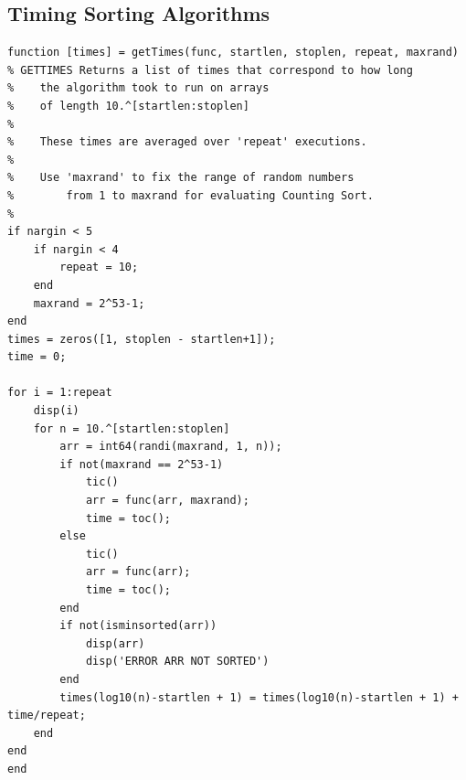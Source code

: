 \documentclass[a4paper]{article}
\begin{document}
\subsection{Timing Sorting Algorithms}
\begin{lstlisting}
function [times] = getTimes(func, startlen, stoplen, repeat, maxrand)
% GETTIMES Returns a list of times that correspond to how long
%    the algorithm took to run on arrays 
%    of length 10.^[startlen:stoplen]
%
%    These times are averaged over 'repeat' executions.
%
%    Use 'maxrand' to fix the range of random numbers
%        from 1 to maxrand for evaluating Counting Sort.
% 
if nargin < 5
    if nargin < 4
        repeat = 10;
    end
    maxrand = 2^53-1;
end
times = zeros([1, stoplen - startlen+1]);
time = 0;

for i = 1:repeat
    disp(i)
    for n = 10.^[startlen:stoplen]
        arr = int64(randi(maxrand, 1, n));
        if not(maxrand == 2^53-1)
            tic()
            arr = func(arr, maxrand);
            time = toc();
        else
            tic()
            arr = func(arr);
            time = toc();
        end
        if not(isminsorted(arr))
            disp(arr)
            disp('ERROR ARR NOT SORTED')
        end
        times(log10(n)-startlen + 1) = times(log10(n)-startlen + 1) + time/repeat;
    end
end
end
\end{lstlisting}
\end{document}
